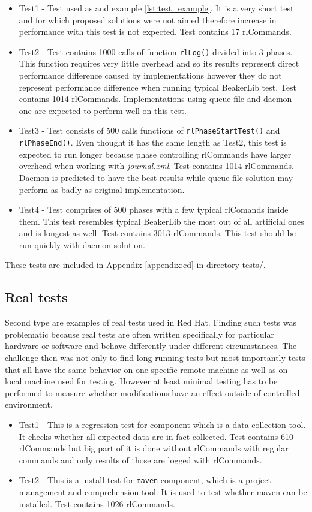 \begin{itemize}
\item Test1 - Test used as and example \ref{lst:test_example}. It is a very short test and for which proposed solutions were not aimed therefore increase in performance with this test is not expected. Test contains 17 rlCommands.
\item Test2 - Test contains 1000 calls of function \texttt{rlLog()} divided into 3 phases. This function requires very little overhead and so its results represent direct performance difference caused by implementations however they do not represent performance difference when running typical BeakerLib test. Test contains 1014 rlCommands. Implementations using queue file and daemon one are expected to perform well on this test.
\item Test3 - Test consists of 500 calls functions of \texttt{rlPhaseStartTest()} and \texttt{rlPhaseEnd()}. Even thought it has the same length as Test2, this test is expected to run longer because phase controlling rlCommands have larger overhead when working with \textit{journal.xml}. Test contains 1014 rlCommands. Daemon is predicted to have the best results while queue file solution may perform as badly as original implementation. 
\item Test4 - Test comprises of 500 phases with a few typical rlComands inside them. This test resembles typical BeakerLib the most out of all artificial ones and is longest as well. Test contains 3013 rlCommands. This test should be run quickly with daemon solution.
\end{itemize}

These tests are included in Appendix \ref{appendix:cd} in directory tests/.

\subsection{Real tests}
Second type are examples of real tests used in Red Hat. Finding such tests was problematic because real tests are often written specifically for particular hardware or software and behave differently under different circumstances. The challenge then was not only to find long running tests but most importantly tests that all have the same behavior on one specific remote machine as well as on local machine used for testing.
However at least minimal testing has to be performed to measure whether modifications have an effect outside of controlled environment.

\begin{itemize}
\item Test1 - This is a regression test for component  which is a data collection tool. It checks whether all expected data are in fact collected. Test contains 610 rlCommands but big part of it is done without rlCommands with regular commands and only results of those are logged with rlCommands.
\item Test2 - This is a install test for \texttt{maven} component, which is a project management and comprehension tool. It is used to test whether maven can be installed. Test contains 1026 rlCommands.
\end{itemize}

